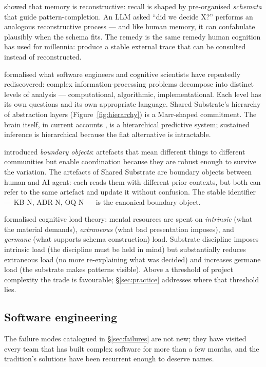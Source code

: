 \documentclass[11pt,a4paper,twocolumn]{article}
\begin{document}
\citet{bartlett1932remembering} showed that memory is reconstructive:
recall is shaped by pre-organised \emph{schemata} that guide
pattern-completion. An LLM asked ``did we decide X?'' performs an
analogous reconstructive process --- and like human memory, it can
confabulate plausibly when the schema fits. The remedy is the same
remedy human cognition has used for millennia: produce a stable
external trace that can be consulted instead of reconstructed.

\citet{marr1982vision} formalised what software engineers and
cognitive scientists have repeatedly rediscovered: complex
information-processing problems decompose into distinct levels of
analysis --- computational, algorithmic, implementational. Each
level has its own questions and its own appropriate language.
Shared Substrate's hierarchy of abstraction layers
(Figure~\ref{fig:hierarchy}) is a Marr-shaped commitment. The brain
itself, in current accounts \citep{friston2010fep, clark2013whatever},
is a hierarchical predictive system; sustained inference is
hierarchical because the flat alternative is intractable.

\citet{star1989boundary} introduced \emph{boundary objects}:
artefacts that mean different things to different communities but
enable coordination because they are robust enough to survive the
variation. The artefacts of Shared Substrate are boundary
objects between human and AI agent: each reads them with different
prior contexts, but both can refer to the same artefact and update
it without confusion. The stable identifier --- KB-N, ADR-N, OQ-N
--- is the canonical boundary object.

\citet{sweller1988cognitive} formalised cognitive load theory:
mental resources are spent on \emph{intrinsic} (what the material
demands), \emph{extraneous} (what bad presentation imposes), and
\emph{germane} (what supports schema construction) load. Substrate
discipline imposes intrinsic load (the discipline must be held in
mind) but substantially reduces extraneous load (no more
re-explaining what was decided) and increases germane load (the
substrate makes patterns visible). Above a threshold of project
complexity the trade is favourable; \S\ref{sec:practice} addresses
where that threshold lies.

\subsection{Software engineering}

The failure modes catalogued in \S\ref{sec:failures} are not new;
they have visited every team that has built complex software for
more than a few months, and the tradition's solutions have been
recurrent enough to deserve names.
\end{document}
